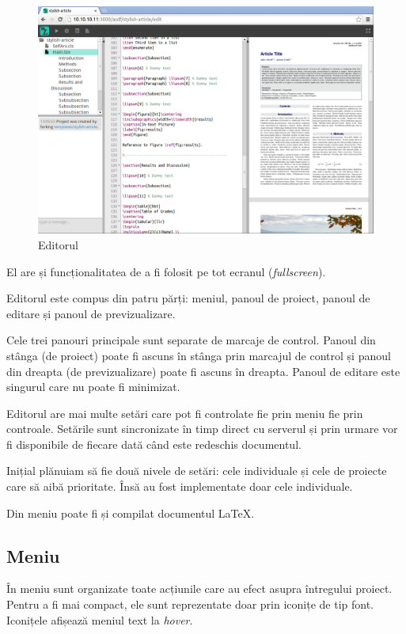 \documentclass[a4wide,12pt]{report}
\newcommand{\eng}[1]{\emph{#1}} %
\begin{document}
\begin{figure}[bh]
\begin{center}
\includegraphics[width=16cm]{imagini/editor}
\end{center}
\caption{Editorul}
\label{editorfig}
\end{figure}

El are și funcționalitatea de a fi folosit pe tot ecranul (\eng{fullscreen}).

Editorul este compus din patru părți: meniul, panoul de proiect, panoul de
editare și panoul de previzualizare.

Cele trei panouri principale sunt separate de marcaje de control. Panoul din
stânga (de proiect) poate fi ascuns în stânga prin marcajul de control și panoul
din dreapta (de previzualizare) poate fi ascuns în dreapta. Panoul de editare
este singurul care nu poate fi minimizat.

Editorul are mai multe setări care pot fi controlate fie prin meniu fie prin
controale. Setările sunt sincronizate în timp direct cu serverul și prin urmare
vor fi disponibile de fiecare dată când este redeschis documentul.

Inițial plănuiam să fie două nivele de setări: cele individuale și cele de
proiecte care să aibă prioritate. Însă au fost implementate doar cele
individuale.

Din meniu poate fi și compilat documentul \LaTeX{}.

\subsection{Meniu}

În meniu sunt organizate toate acțiunile care au efect asupra întregului
proiect. Pentru a fi mai compact, ele sunt reprezentate doar prin iconițe de tip
font. Iconițele afișează meniul text la \eng{hover}.
\end{document}
